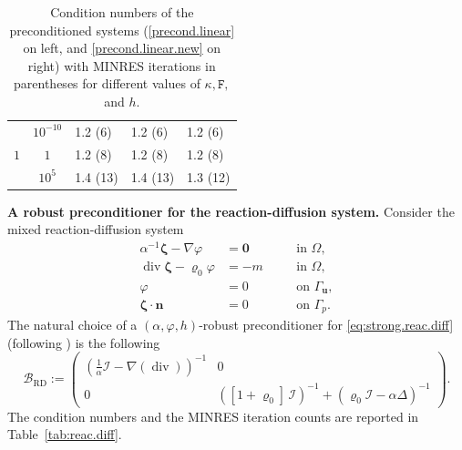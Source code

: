 \documentclass[11pt, reqno, a4paper, twoside]{article}
\newcommand{\bn}{\boldsymbol{n}}
\newcommand{\bu}{\boldsymbol{u}}
\newcommand\bzeta{\boldsymbol{\zeta}}
\newcommand\bzero{\boldsymbol{0}}
\newcommand{\rF}{\mathtt{F}}
\newcommand{\cI}{\mathcal{I}}
\newcommand\vdiv{\mathop{\mathrm{div}}\nolimits}
\numberwithin{equation}{section}
\numberwithin{remark}{section}
\numberwithin{figure}{section}
\numberwithin{table}{section}
\begin{document}
\begin{table}[t!]
{\begin{minipage}{0.48\textwidth}
\begin{tabular}{|c | c | l l l|}
\hline

\multirow{3}{*}{$1$}
& $10^{-10}$ & 1.2 (6) & 1.2 (6) & 1.2 (6) \\
& $1$        & 1.2 (8) & 1.2 (8) & 1.2 (8) \\
& $10^{5}$   & 1.4 (13) & 1.4 (13) & 1.3 (12) \\

\hline
\end{tabular}
\end{minipage}
}

\caption{Condition numbers of the preconditioned systems (\eqref{precond.linear} on left, and \eqref{precond.linear.new} on right) with MINRES iterations in parentheses for different values of $\kappa, \rF,$ and $h$.}
\label{tab:DF.prec}
\end{table}

\smallskip
\noindent\textbf{A robust preconditioner for the reaction-diffusion system.}
Consider the mixed reaction-diffusion system 
\begin{equation}\label{eq:strong.reac.diff}
\begin{aligned}
    \alpha^{-1}\bzeta - \nabla \varphi & = \bzero \quad && \text{in }\Omega,\\
    \vdiv \bzeta - \varrho_0 \varphi & = -m \quad && \text{in }\Omega,\\
    \varphi & = 0 \quad && \text{on }\Gamma_{\bu},\\
    \bzeta \cdot \bn & = 0 \quad && \text{on }\Gamma_p.
\end{aligned}
\end{equation}
The natural choice of a \((\alpha,\varphi,h)\)-robust preconditioner for \eqref{eq:strong.reac.diff} (following \cite[Equation~3.8]{boon2021robust}) is the following 
  \begin{equation}\label{abstract-prec-reac.diff} 
\mathcal{B}_{{\mathrm{RD}}}:= \begin{pmatrix} (\frac{1}{\alpha}\cI - \nabla(\vdiv) )^{-1} & 0 \\ 0 & ([1+\varrho_0]\,\mathcal{I})^{-1}+(\varrho_0\mathcal{I}- {\alpha}\Delta )^{-1}
\end{pmatrix}.
\end{equation}
The condition numbers and the MINRES iteration counts are reported in Table~\ref{tab:reac.diff}.
\end{document}
